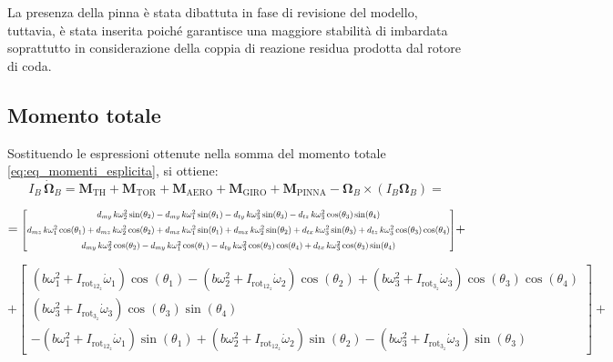 La presenza della pinna è stata dibattuta in fase di revisione del modello, 
tuttavia, è stata inserita poiché garantisce una maggiore 
stabilità di imbardata soprattutto in considerazione della coppia
di reazione residua prodotta dal rotore di coda.  
\clearpage

\subsection{Momento totale} 
Sostituendo le espressioni ottenute nella somma del momento totale \ref{eq:eq_momenti_esplicita}, si ottiene:
	    \begin{equation*}
	    	I_B \, \dot{\bm{\Omega}}_B =
	    	\bm{M}_{\text{TH}} + \bm{M}_{\text{TOR}}+\bm{M}_{\text{AERO}}  +  \bm{M}_{\text{GIRO}} +  \bm{M}_{\text{PINNA}}  -
	    	\bm{\Omega}_B \times (I_B \bm{\Omega}_B) =
	    \end{equation*}
	    
	     \begin{equation*}
	    	 = \resizebox{0.99\textwidth}{!}{$
	    	 	\begin{bmatrix}
	    	 		d_{my} \, k \omega_2^2 \sin(\theta_2) 
	    	 		- d_{my} \, k \omega_1^2 \sin(\theta_1) 
	    	 		- d_{ty} \, k \omega_3^2 \sin(\theta_3) 
	    	 		- d_{tz} \, k \omega_3^2 \cos(\theta_3) \sin(\theta_4) \\[6pt]
	    	 		d_{mz} \, k \omega_1^2 \cos(\theta_1) 
	    	 		+ d_{mz} \, k \omega_2^2 \cos(\theta_2) 
	    	 		+ d_{mx} \, k \omega_1^2 \sin(\theta_1) 
	    	 		+ d_{mx} \, k \omega_2^2 \sin(\theta_2) 
	    	 		+ d_{tx} \, k \omega_3^2 \sin(\theta_3) 
	    	 		+ d_{tz} \, k \omega_3^2 \cos(\theta_3) \cos(\theta_4) \\[6pt]
	    	 		d_{my} \, k \omega_2^2 \cos(\theta_2) 
	    	 		- d_{my} \, k \omega_1^2 \cos(\theta_1) 
	    	 		- d_{ty} \, k \omega_3^2 \cos(\theta_3) \cos(\theta_4) 
	    	 		+ d_{tx} \, k \omega_3^2 \cos(\theta_3) \sin(\theta_4)
	    	 	\end{bmatrix}
	    	 	$} +
	    \end{equation*}
	    
	   	  \begin{equation*}
	  	+	\begin{bmatrix}
	  		(b\omega_{1}^2+I_{\text{rot}_{12_{z}}}\dot\omega_{1}) \cos(\theta_1) -	(b\omega_{2}^2+I_{\text{rot}_{12_{z}}}\dot\omega_{2}) \cos(\theta_2) + (b\omega_{3}^2+I_{\text{rot}_{3_{z}}}\dot\omega_{3})\cos(\theta_3)\cos(\theta_4) \\
	  		(b\omega_{3}^2+I_{\text{rot}_{3_{z}}}\dot\omega_{3})\cos(\theta_3)\sin(\theta_4) \\
	  		-	(b\omega_{1}^2+I_{\text{rot}_{12_{z}}}\dot\omega_{1})\sin(\theta_1)+ 	(b\omega_{2}^2+I_{\text{rot}_{12_{z}}}\dot\omega_{2})  \sin(\theta_2)	-	(b\omega_{3}^2+I_{\text{rot}_{3_{z}}}\dot\omega_{3})\sin(\theta_3)
	  	\end{bmatrix}+
	  \end{equation*}
	    
